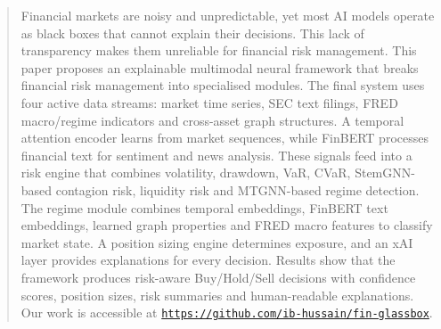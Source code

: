 \documentclass[conference]{IEEEtran}
\begin{document}
\begin{abstract}
Financial markets are noisy and unpredictable, yet most AI models operate as black boxes that cannot explain their decisions. This lack of transparency makes them unreliable for financial risk management. This paper proposes an explainable multimodal neural framework that breaks financial risk management into specialised modules. The final system uses four active data streams: market time series, SEC text filings, FRED macro/regime indicators and cross-asset graph structures. A temporal attention encoder learns from market sequences, while FinBERT processes financial text for sentiment and news analysis. These signals feed into a risk engine that combines volatility, drawdown, VaR, CVaR, StemGNN-based contagion risk, liquidity risk and MTGNN-based regime detection. The regime module combines temporal embeddings, FinBERT text embeddings, learned graph properties and FRED macro features to classify market state. A position sizing engine determines exposure, and an xAI layer provides explanations for every decision. Results show that the framework produces risk-aware Buy/Hold/Sell decisions with confidence scores, position sizes, risk summaries and human-readable explanations. Our work is accessible at \textmd{\texttt{\url{https://github.com/ib-hussain/fin-glassbox}}}.
\end{abstract}
\end{document}
